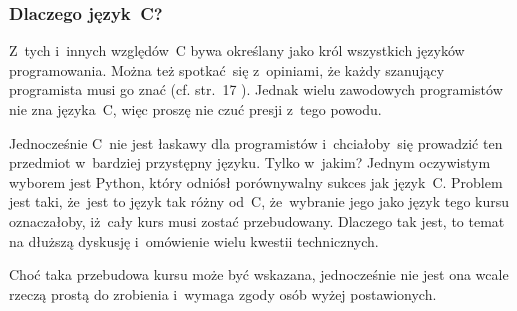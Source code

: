\documentclass[10pt,t]{beamer}
\begin{document}
\begin{frame}
  \frametitle{Dlaczego język~C?}


  Z~tych i~innych względów~C bywa określany jako król wszystkich języków
  programowania. Można też spotkać~się z~opiniami, że każdy szanujący
  programista musi go znać (cf. str.~17
  \parencite{Hoey-Programowanie-w-asemblerze-x64-ETC-Pub-2024}). Jednak
  wielu zawodowych programistów nie zna języka~C, więc proszę nie czuć
  presji z~tego powodu.

  Jednocześnie C~nie jest łaskawy dla programistów i~chciałoby~się prowadzić
  ten przedmiot w~bardziej przystępny języku. Tylko w~jakim? Jednym
  oczywistym wyborem jest Python, który odniósł porównywalny sukces jak
  język~C. Problem jest taki, że~jest to język tak różny od~C, że~wybranie
  jego jako język tego kursu oznaczałoby, iż~cały kurs musi zostać
  przebudowany. Dlaczego tak jest, to temat na dłuższą dyskusję
  i~omówienie wielu kwestii technicznych.

  Choć taka przebudowa kursu może być wskazana, jednocześnie nie jest
  ona wcale rzeczą prostą do zrobienia i~wymaga zgody osób wyżej
  postawionych.

\end{frame}
\end{document}
